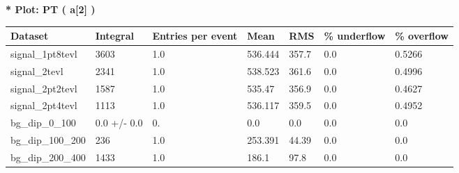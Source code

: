 \documentclass[a4paper, 10pt]{article}
\begin{document}
\textbf{* Plot: PT ( a[2] ) }\\
   \begin{table}[H]
  \begin{center}
    \begin{tabular}{|m{23.0mm}|m{23.0mm}|m{18.0mm}|m{19.0mm}|m{19.0mm}|m{19.0mm}|m{19.0mm}|}
      \hline
      {\cellcolor{yellow}         Dataset}& {\cellcolor{yellow}         Integral}& {\cellcolor{yellow}         Entries per event}& {\cellcolor{yellow}         Mean}& {\cellcolor{yellow}         RMS}& {\cellcolor{yellow}         \% underflow}& {\cellcolor{yellow}         \% overflow}\\
      \hline
      {\cellcolor{white}         signal\_1pt8tevl}& {\cellcolor{white}         3603}& {\cellcolor{white}         1.0}& {\cellcolor{white}         536.444}& {\cellcolor{white}         357.7}& {\cellcolor{green}         0.0}& {\cellcolor{green}         0.5266}\\
      \hline
      {\cellcolor{white}         signal\_2tevl}& {\cellcolor{white}         2341}& {\cellcolor{white}         1.0}& {\cellcolor{white}         538.523}& {\cellcolor{white}         361.6}& {\cellcolor{green}         0.0}& {\cellcolor{green}         0.4996}\\
      \hline
      {\cellcolor{white}         signal\_2pt2tevl}& {\cellcolor{white}         1587}& {\cellcolor{white}         1.0}& {\cellcolor{white}         535.47}& {\cellcolor{white}         356.9}& {\cellcolor{green}         0.0}& {\cellcolor{green}         0.4627}\\
      \hline
      {\cellcolor{white}         signal\_2pt4tevl}& {\cellcolor{white}         1113}& {\cellcolor{white}         1.0}& {\cellcolor{white}         536.117}& {\cellcolor{white}         359.5}& {\cellcolor{green}         0.0}& {\cellcolor{green}         0.4952}\\
      \hline
      {\cellcolor{white}         bg\_dip\_0\_100}& {\cellcolor{white}         0.0 +/\-- 0.0}& {\cellcolor{white}         0.}& {\cellcolor{white}         0.0}& {\cellcolor{white}         0.0}& {\cellcolor{green}         0.0}& {\cellcolor{green}         0.0}\\
      \hline
      {\cellcolor{white}         bg\_dip\_100\_200}& {\cellcolor{white}         236}& {\cellcolor{white}         1.0}& {\cellcolor{white}         253.391}& {\cellcolor{white}         44.39}& {\cellcolor{green}         0.0}& {\cellcolor{green}         0.0}\\
      \hline
      {\cellcolor{white}         bg\_dip\_200\_400}& {\cellcolor{white}         1433}& {\cellcolor{white}         1.0}& {\cellcolor{white}         186.1}& {\cellcolor{white}         97.8}& {\cellcolor{green}         0.0}& {\cellcolor{green}         0.0}\\

\end{tabular}
\end{center}
\end{table}
\end{document}
